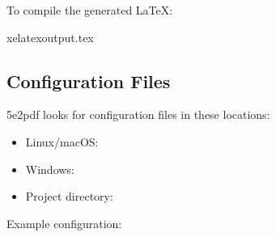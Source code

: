 \documentclass[letterpaper,10pt,english]{sphinxmanual}
\begin{document}
\sphinxAtStartPar
To compile the generated LaTeX:

\begin{sphinxVerbatim}[commandchars=\\\{\}]
xelatexoutput.tex
\end{sphinxVerbatim}


\subsection{Configuration Files}
\label{\detokenize{user-guide/cli-reference:configuration-files}}
\sphinxAtStartPar
5e2pdf looks for configuration files in these locations:
\begin{itemize}
\item {} 
\sphinxAtStartPar
Linux/macOS: 

\item {} 
\sphinxAtStartPar
Windows: 

\item {} 
\sphinxAtStartPar
Project directory: 

\end{itemize}

\sphinxAtStartPar
Example configuration:
\end{document}
